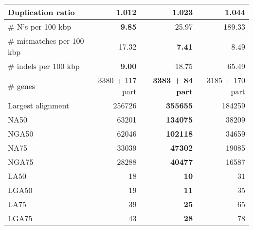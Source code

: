 \documentclass[12pt,a4paper]{article}
\begin{document}
\begin{table}[ht]
\begin{center}
\begin{tabular}{|l*{3}{|r}|}
Duplication ratio & {\bf 1.012} & 1.023 & 1.044 \\ \hline
\# N's per 100 kbp & {\bf 9.85} & 25.97 & 189.33 \\ \hline
\# mismatches per 100 kbp & 17.32 & {\bf 7.41} & 8.49 \\ \hline
\# indels per 100 kbp & {\bf 9.00} & 18.75 & 65.49 \\ \hline
\# genes & 3380 + 117 part & {\bf 3383 + 84 part} & 3185 + 170 part \\ \hline
Largest alignment & 256726 & {\bf 355655} & 184259 \\ \hline
NA50 & 63201 & {\bf 134075} & 38209 \\ \hline
NGA50 & 62046 & {\bf 102118} & 34659 \\ \hline
NA75 & 33039 & {\bf 47302} & 19085 \\ \hline
NGA75 & 28288 & {\bf 40477} & 16587 \\ \hline
LA50 & 18 & {\bf 10} & 31 \\ \hline
LGA50 & 19 & {\bf 11} & 35 \\ \hline
LA75 & 39 & {\bf 25} & 65 \\ \hline
LGA75 & 43 & {\bf 28} & 78 \\ \hline
\end{tabular}
\end{center}
\end{table}
\end{document}
